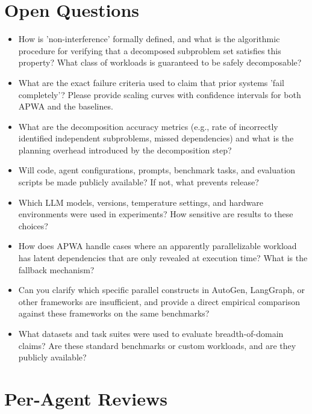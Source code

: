 \documentclass[11pt]{article}
\begin{document}
\section*{Open Questions}
\begin{itemize}[leftmargin=*]
  \item How is 'non-interference' formally defined, and what is the algorithmic procedure for verifying that a decomposed subproblem set satisfies this property? What class of workloads is guaranteed to be safely decomposable?
  \item What are the exact failure criteria used to claim that prior systems 'fail completely'? Please provide scaling curves with confidence intervals for both APWA and the baselines.
  \item What are the decomposition accuracy metrics (e.g., rate of incorrectly identified independent subproblems, missed dependencies) and what is the planning overhead introduced by the decomposition step?
  \item Will code, agent configurations, prompts, benchmark tasks, and evaluation scripts be made publicly available? If not, what prevents release?
  \item Which LLM models, versions, temperature settings, and hardware environments were used in experiments? How sensitive are results to these choices?
  \item How does APWA handle cases where an apparently parallelizable workload has latent dependencies that are only revealed at execution time? What is the fallback mechanism?
  \item Can you clarify which specific parallel constructs in AutoGen, LangGraph, or other frameworks are insufficient, and provide a direct empirical comparison against these frameworks on the same benchmarks?
  \item What datasets and task suites were used to evaluate breadth-of-domain claims? Are these standard benchmarks or custom workloads, and are they publicly available?
\end{itemize}

\section*{Per-Agent Reviews}
\end{document}
